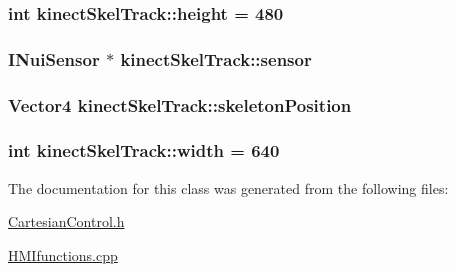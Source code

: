 \subsubsection[{\texorpdfstring{height}{height}}]{\setlength{\rightskip}{0pt plus 5cm}int kinect\+Skel\+Track\+::height = 480}\hypertarget{classkinectSkelTrack_a028f14282cd4301c8527703300d3dfe8}{}\label{classkinectSkelTrack_a028f14282cd4301c8527703300d3dfe8}
\subsubsection[{\texorpdfstring{sensor}{sensor}}]{\setlength{\rightskip}{0pt plus 5cm}I\+Nui\+Sensor $\ast$ kinect\+Skel\+Track\+::sensor}\hypertarget{classkinectSkelTrack_aaf976c279cb27cc57af90d65d4a7918a}{}\label{classkinectSkelTrack_aaf976c279cb27cc57af90d65d4a7918a}
\subsubsection[{\texorpdfstring{skeleton\+Position}{skeletonPosition}}]{\setlength{\rightskip}{0pt plus 5cm}Vector4 kinect\+Skel\+Track\+::skeleton\+Position}\hypertarget{classkinectSkelTrack_a51e7bc6d4d52ea917922103e9261cd1f}{}\label{classkinectSkelTrack_a51e7bc6d4d52ea917922103e9261cd1f}
\subsubsection[{\texorpdfstring{width}{width}}]{\setlength{\rightskip}{0pt plus 5cm}int kinect\+Skel\+Track\+::width = 640}\hypertarget{classkinectSkelTrack_a8f20f39c8822eecba07518a8b35a9f2b}{}\label{classkinectSkelTrack_a8f20f39c8822eecba07518a8b35a9f2b}


The documentation for this class was generated from the following files\+:\begin{DoxyCompactItemize}
\item 
\hyperlink{CartesianControl_8h}{Cartesian\+Control.\+h}\item 
\hyperlink{HMIfunctions_8cpp}{H\+M\+Ifunctions.\+cpp}\end{DoxyCompactItemize}
